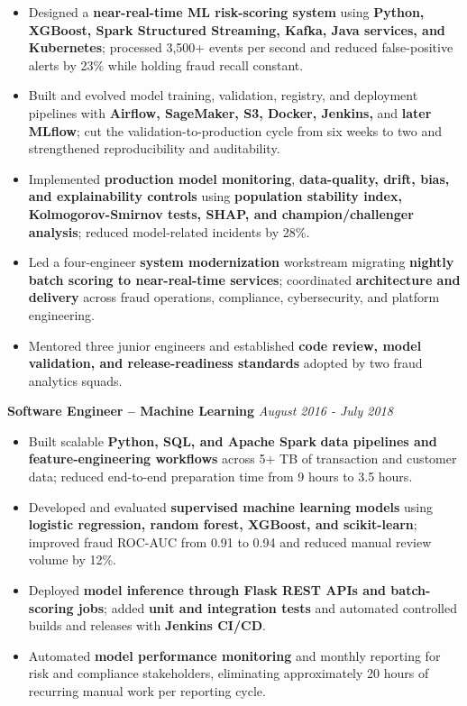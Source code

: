 \documentclass[10pt,letterpaper]{article}
\renewcommand{\emph}[1]{{\fontsize{9.5}{10.26}\selectfont\color{ResumeDates}\itshape #1}}
\providecommand{\tightlist}{%
  \setlength{\itemsep}{2.25pt}\setlength{\parskip}{0pt}}
\begin{document}
\begin{itemize}
\tightlist
\item
  Designed a \textbf{near-real-time ML risk-scoring system} using
  \textbf{Python, XGBoost, Spark Structured Streaming, Kafka, Java
  services, and Kubernetes}; processed 3,500+ events per second and
  reduced false-positive alerts by 23\% while holding fraud recall
  constant.
\item
  Built and evolved model training, validation, registry, and deployment
  pipelines with \textbf{Airflow, SageMaker, S3, Docker, Jenkins,} and
  \textbf{later MLflow}; cut the validation-to-production cycle from six
  weeks to two and strengthened reproducibility and auditability.
\item
  Implemented \textbf{production model monitoring},
  \textbf{data-quality, drift, bias, and explainability controls} using
  \textbf{population stability index, Kolmogorov-Smirnov tests, SHAP,
  and champion/challenger analysis}; reduced model-related incidents by
  28\%.
\item
  Led a four-engineer \textbf{system modernization} workstream migrating
  \textbf{nightly batch scoring to near-real-time services}; coordinated
  \textbf{architecture and delivery} across fraud operations,
  compliance, cybersecurity, and platform engineering.
\item
  Mentored three junior engineers and established \textbf{code review,
  model validation, and release-readiness standards} adopted by two
  fraud analytics squads.
\end{itemize}

\textbf{Software Engineer -- Machine Learning} \textbar{} \emph{August
2016 - July 2018}

\begin{itemize}
\tightlist
\item
  Built scalable \textbf{Python, SQL, and Apache Spark} \textbf{data
  pipelines and feature-engineering workflows} across 5+ TB of
  transaction and customer data; reduced end-to-end preparation time
  from 9 hours to 3.5 hours.
\item
  Developed and evaluated \textbf{supervised machine learning models}
  using \textbf{logistic regression, random forest, XGBoost, and
  scikit-learn}; improved fraud ROC-AUC from 0.91 to 0.94 and reduced
  manual review volume by 12\%.
\item
  Deployed \textbf{model inference through Flask REST APIs and
  batch-scoring jobs}; added \textbf{unit and integration tests} and
  automated controlled builds and releases with \textbf{Jenkins CI/CD}.
\item
  Automated \textbf{model performance monitoring} and monthly reporting
  for risk and compliance stakeholders, eliminating approximately 20
  hours of recurring manual work per reporting cycle.
\end{itemize}
\end{document}
